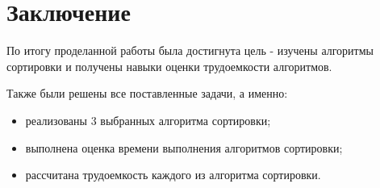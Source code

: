 \chapter*{Заключение}
По итогу проделанной работы была достигнута цель - изучены алгоритмы сортировки и получены навыки оценки трудоемкости алгоритмов.

Также были решены все поставленные задачи, а именно:

\begin{itemize}
	\item реализованы 3 выбранных алгоритма сортировки;
	\item выполнена оценка времени выполнения алгоритмов сортировки;
	\item рассчитана трудоемкость каждого из алгоритма сортировки.
\end{itemize}